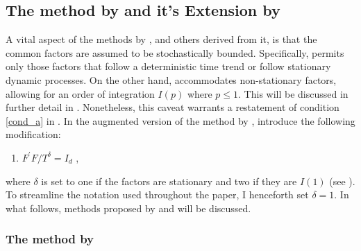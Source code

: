 \subsection{The method by \citet{bai2009panel} and it's Extension by \citet{bada2014parameter}}

 A vital aspect of the methods by \citet{bai2009panel}, and others derived from it, is that the common factors are assumed to be stochastically bounded. Specifically, \citet{bai2009panel} permits only those factors that follow a deterministic time trend or follow stationary dynamic processes. On the other hand, \citet{bada2014parameter} accommodates non-stationary factors, allowing for an order of integration $I(p)$ where $p \leq 1$. This will be discussed in further detail in . Nonetheless, this caveat warrants a restatement of condition \ref{cond_a} in .  In the  augmented version of the method by \cite{bai2009panel}, \citet{bada2014parameter} introduce the following modification: 
\begin{enumerate}[label = (\alph*$^\prime$)]
    \item $F^\prime F/T^\delta = I_d$ ,
\end{enumerate}
where $\delta$ is set to one if the factors are stationary and two if they are $I(1)$ (see \citet{bai2004estimating}). To streamline the notation used throughout the paper, I henceforth set $\delta = 1$. In what follows, methods proposed by   \citet{bai2009panel} and \citet{bada2014parameter}  will be discussed.



\subsubsection{The method by \citet{bai2009panel}}

